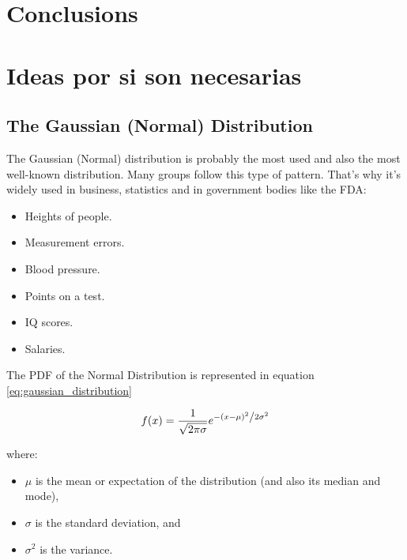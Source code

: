 
\section{Conclusions}\label{sec:conclusions}

\section{Ideas por si son necesarias}

\subsection{The Gaussian (Normal) Distribution}
The Gaussian (Normal) distribution is probably the most used and also the most well-known distribution. Many groups follow this type of pattern. That's why it's widely used in business, statistics and in government bodies like the FDA:
\begin{itemize}
\item Heights of people.
\item Measurement errors.
\item Blood pressure.
\item Points on a test.
\item IQ scores.
\item Salaries.
\end{itemize}

The PDF of the Normal Distribution is represented in equation \ref{eq:gaussian_distribution}

\begin{equation}\label{eq:gaussian_distribution}
f(x) = \frac{1}{{ \sqrt {2\pi \sigma} }}e^{{{ - \left( {x - \mu } \right)^2 } \mathord{\left/ {\vphantom {{ - \left( {x - \mu } \right)^2 } {2\sigma ^2 }}} \right. \kern-\nulldelimiterspace} {2\sigma ^2 }}}
\end{equation}

where:
\begin{itemize}
\item $\mu$ is the mean or expectation of the distribution (and also its median and mode),
\item $\sigma$ is the standard deviation, and
\item $\sigma^2$ is the variance.
\end{itemize}

